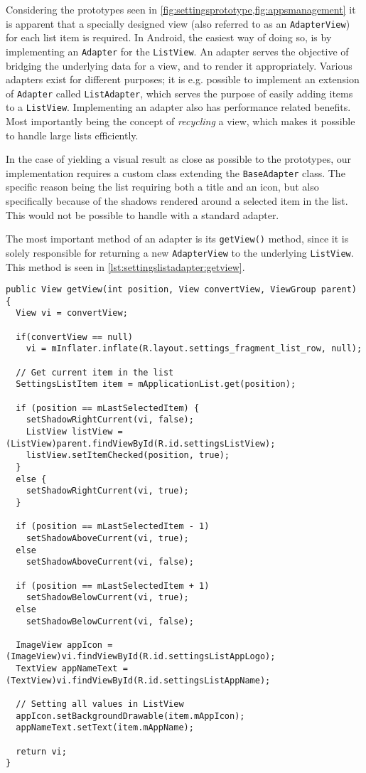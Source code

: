 Considering the prototypes seen in \cref{fig:settingsprototype,fig:appsmanagement} it is apparent that a specially designed view (also referred to as an \lstinline|AdapterView|) for each list item is required.
In Android, the easiest way of doing so, is by implementing an \lstinline|Adapter| for the \lstinline|ListView|.
An adapter serves the objective of bridging the underlying data for a view, and to render it appropriately.
Various adapters exist for different purposes; it is e.g. possible to implement an extension of \lstinline|Adapter| called \lstinline|ListAdapter|, which serves the purpose of easily adding items to a \lstinline|ListView|.
Implementing an adapter also has performance related benefits.
Most importantly being the concept of \textit{recycling} a view, which makes it possible to handle large lists efficiently.

In the case of yielding a visual result as close as possible to the prototypes, our implementation requires a custom class extending the \lstinline|BaseAdapter| class.
The specific reason being the list requiring both a title and an icon, but also specifically because of the shadows rendered around a selected item in the list.
This would not be possible to handle with a standard adapter.

The most important method of an adapter is its \lstinline|getView()| method, since it is solely responsible for returning a new \lstinline|AdapterView| to the underlying \lstinline|ListView|.
This method is seen in \cref{lst:settingslistadapter:getview}.

\begin{lstlisting}[caption={\lstinline|getView()| method in \lstinline|SettingsListAdapter| class.}, label={lst:settingslistadapter:getview}]
public View getView(int position, View convertView, ViewGroup parent) {
  View vi = convertView;
  
  if(convertView == null)
    vi = mInflater.inflate(R.layout.settings_fragment_list_row, null);
  
  // Get current item in the list
  SettingsListItem item = mApplicationList.get(position);
  
  if (position == mLastSelectedItem) {
    setShadowRightCurrent(vi, false);
    ListView listView = (ListView)parent.findViewById(R.id.settingsListView);
    listView.setItemChecked(position, true);
  }
  else {
    setShadowRightCurrent(vi, true);
  }
  
  if (position == mLastSelectedItem - 1)
    setShadowAboveCurrent(vi, true);
  else
    setShadowAboveCurrent(vi, false);
  
  if (position == mLastSelectedItem + 1)
    setShadowBelowCurrent(vi, true);
  else
    setShadowBelowCurrent(vi, false);
  
  ImageView appIcon = (ImageView)vi.findViewById(R.id.settingsListAppLogo);
  TextView appNameText = (TextView)vi.findViewById(R.id.settingsListAppName);
  
  // Setting all values in ListView
  appIcon.setBackgroundDrawable(item.mAppIcon);
  appNameText.setText(item.mAppName);
  
  return vi;
}
\end{lstlisting}

